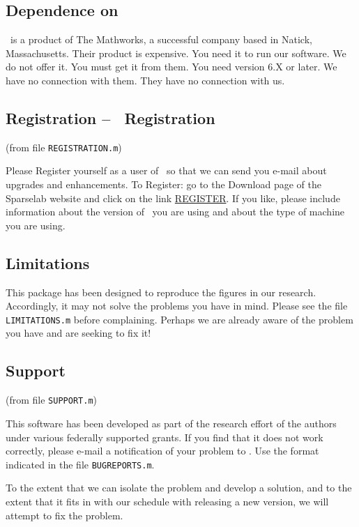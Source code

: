 \documentclass{article}
\begin{document}
\subsection{Dependence on \Matlab}

\Matlab\ is a product of The Mathworks, a successful company based in Natick, Massachusetts. Their
product is expensive. You need it to run our software. We do not offer it. You must get it from
them. You need version 6.X or later. We have no connection with them. They have no connection with
us.

\subsection{Registration -- \WaveLab\ Registration}

(from file {\tt REGISTRATION.m})

Please Register yourself as a user of \WaveLab\ so that we can send you e-mail about upgrades and
enhancements. To Register: go to the Download page of the Sparselab website \WLWEB and click on the
link \underline{REGISTER}. If you like, please include information about the version of \Matlab\
you are using and about the type of machine you are using.

\subsection{Limitations}

This package has been designed to reproduce the figures in our research. Accordingly, it may not
solve the problems you have in mind. Please see the file {\tt LIMITATIONS.m} before complaining.
Perhaps we are already aware of the problem you have and are seeking to fix it!

\subsection{Support}

(from file {\tt SUPPORT.m})

This software has been developed as part of the research effort of the authors under various
federally supported grants.  If you find that it does not work correctly, please e-mail a
notification of your problem to \WaveLab.  Use the format indicated in the file {\tt BUGREPORTS.m}.

To the extent that we can isolate the problem and develop a solution, and to the extent that it
fits in with our schedule with releasing a new version, we will attempt to fix the problem.
\end{document}
